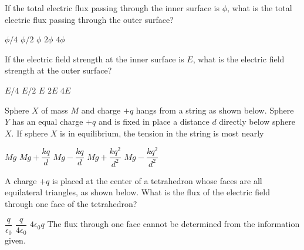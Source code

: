 \documentclass[12pt]{../../oss-classkick-exam}
\begin{document}
\begin{questions}
  \question If the total electric flux passing through the inner surface is
  $\phi$, what is the total electric flux passing through the outer surface?
  \begin{choices}
    \choice $\phi/4$
    \choice $\phi/2$
    \choice $\phi$
    \choice $2\phi$
    \choice $4\phi$
  \end{choices}
  \label{sphere1}
  
  \question If the electric field strength at the inner surface is $E$, what is
  the electric field strength at the outer surface?
  \begin{choices}
    \choice $E/4$
    \choice $E/2$
    \choice $E$
    \choice $2E$
    \choice $4E$
  \end{choices}
  \label{sphere2}
  
  \uplevel{\rule{\linewidth}{.5pt}}
  
  \question Sphere $X$ of mass $M$ and charge $+q$ hangs from a string as shown
  below. Sphere $Y$ has an equal charge $+q$ and is fixed in place a distance
  $d$ directly below sphere $X$. If sphere $X$ is in equilibrium, the tension
  in the string is most nearly

  \begin{minipage}{.35\linewidth}
  \end{minipage}
  \begin{minipage}{.5\linewidth}
    \begin{choices}
      \choice $Mg$
      \choice $Mg+\dfrac{kq}d$
      \choice $Mg-\dfrac{kq}d$
      \choice $Mg+\dfrac{kq^2}{d^2}$
      \choice $Mg-\dfrac{kq^2}{d^2}$
    \end{choices}
  \end{minipage}
  
  \uplevel{\rule{\linewidth}{.5pt}}
  
  \question A charge $+q$ is placed at the center of a tetrahedron whose faces
  are all equilateral triangles, as shown below. What is the flux of the
  electric field through one face of the tetrahedron?

  \begin{minipage}{.3\linewidth}
  \end{minipage}
  \begin{minipage}{.69\linewidth}
    \begin{choices}
      \choice $\dfrac{q}{\epsilon_0}$
      \choice $\dfrac{q}{4\epsilon_0}$
      \choice $4\epsilon_0q$
      \choice The flux through one face cannot be determined from the
      information given.
    \end{choices}
  \end{minipage}
  \newpage
  

\end{questions}
\end{document}
